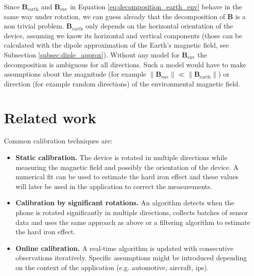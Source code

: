 
Since $\bm{B}_\text{earth}$ and $\bm{B}_\text{env}$ in Equation \ref{eq:decomposition_earth_env} behave in the same way under rotation, we can guess already that the decomposition of $\bm{B}$ is a non trivial problem. $\bm{B}_\text{earth}$ only depends on the horizontal orientation of the device, assuming we know its horizontal and vertical components (those can be calculated with the dipole approximation of the Earth's magnetic field, see Subsection \ref{subsec:diple_approx}). Without any model for $\bm{B}_\text{env}$ the decomposition is ambiguous for all directions. Such a model would have to make assumptions about the magnitude (for example $\lVert \bm{B}_\text{env} \rVert \ll \lVert \bm{B}_\text{earth} \rVert$) or direction (for example random directions) of the environmental magnetic field.

\section{Related work}

Common calibration techniques are:

\begin{itemize}
  \item \textbf{Static calibration.} The device is rotated in multiple directions while measuring the magnetic field and possibly the orientation of the device. A numerical fit can be used to estimate the hard iron effect and these values will later be used in the application to correct the measurements.\cite{matlab_magcal}\cite{Kuncar2016}\cite{Kok2016}
  \item \textbf{Calibration by significant rotations.} An algorithm detects when the phone is rotated significantly in multiple directions, collects batches of sensor data and uses the same approach as above or a filtering algorithm to estimate the hard iron effect.\cite{Guo2008}\cite{Gebre2006}\cite{Vasconcelos2011}
  \item \textbf{Online calibration.} A real-time algorithm is updated with consecutive observations iteratively. Specific assumptions might be introduced depending on the context of the application (e.g. automotive, aircraft, \gls{ips}). \cite{Wu2018}\cite{Cao2020}
\end{itemize}
